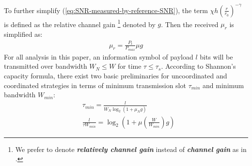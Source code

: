 To further simplify (\ref{eq:SNR-measured-by-reference-SNR}), the term $\chi h \left( \frac{r}{r_0} \right) ^{-\gamma}$ is defined as the relative channel gain \footnote{We prefer to denote \textbf{\textit{relatively channel gain}} instead of \textbf{\textit{channel gain}} as in \cite{Dhi13}.} denoted by $g$. 
Then the received $\mu_r$ is simplified as:
\begin{align}
\mu_r = \frac{P_t}{P_{max}} \mu g \label{eq:received-snr}
\end{align}
For all analysis in this paper, an information symbol of payload $l$ bits will be transmitted over bandwidth $W_N \leq W $ for time $\tau \leq \tau_s$. According to Shannon's capacity formula, there exist two basic preliminaries for uncoordinated and coordinated strategies in terms of minimum transmission slot $\tau_{min}$ and minimum bandwidth $W_{min}$:
\begin{align}
& \tau_{min} = \frac{l}{W_{N}\log_{2}\left( 1+\mu_{N}g\right) } \label{constraint-time}\\
& \frac{l}{\tau W_{min}} = \log_{2} \left( 1+\mu\left( \frac{W}{W_{min}}\right) g\right)   \label{constraint-freq}
\end{align}